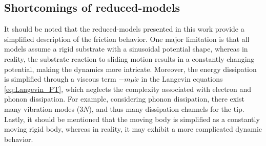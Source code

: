 \subsection{Shortcomings of reduced-models}
It should be noted that the reduced-models presented in this work provide a simplified description of the friction behavior. One major limitation is that all models assume a rigid substrate with a sinusoidal potential shape, whereas in reality, the substrate reaction to sliding motion results in a constantly changing potential, making the dynamics more intricate. Moreover, the energy dissipation is simplified through a viscous term $-m\mu \dot{x}$ in the Langevin equations \cref{eq:Langevin_PT}, which neglects the complexity associated with electron and phonon dissipation. For example, considering phonon dissipation, there exist many vibration modes ($3N$), and thus many dissipation channels for the tip. Lastly, it should be mentioned that the moving body is simplified as a constantly moving rigid body, whereas in reality, it may exhibit a more complicated dynamic behavior.







